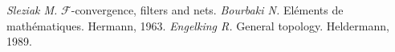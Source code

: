 \documentclass[12pt]{article}
\begin{document}
\newpage
\begin{thebibliography}{999}
    \textit{Sleziak M.} $\mathcal{F}$-convergence, filters and nets.
    \textit{Bourbaki N. } Eléments de mathématiques. Hermann, 1963.
    \textit{Engelking R.} General topology. Heldermann, 1989.
\end{thebibliography}
\end{document}
